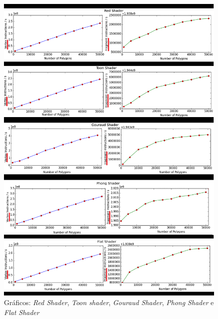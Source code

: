 	\begin{figure}[ht]
	\centering
		\includegraphics[keepaspectratio=true,scale=0.55]{figuras/red.png}
	\caption{Gráficos: \textit{Red Shader}, \textit{Toon shader}, \textit{Gouraud Shader},  \textit{Phong Shader} e  \textit{Flat Shader}}
	\label{plotred}
	\end{figure}

